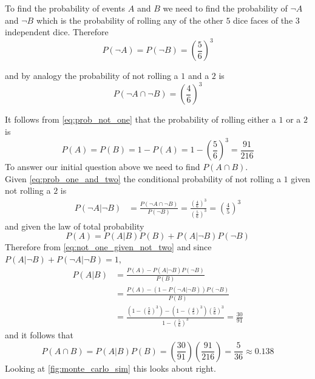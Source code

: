 \documentclass[12pt,a4paper]{article}
\begin{document}
To find the probability of events $A$ and $B$ we need to find the probability of $\neg A$ and $\neg B$ which is the probability of rolling any of the other $5$ dice faces of the $3$ independent dice. Therefore
\begin{equation}
P(\neg A) = P(\neg B) = \left(\frac{5}{6}\right)^3
\label{eq:prob_not_one}
\end{equation}

and by analogy the probability of not rolling a $1$ and a $2$ is
\begin{equation}
P(\neg A \cap \neg B) = \left(\frac{4}{6}\right)^3
\label{eq:prob_one_and_two}
\end{equation}

It follows from \cref{eq:prob_not_one} that the probability of rolling either a $1$ or a $2$ is
\begin{equation}
P(A) = P(B) = 1-P(A) = 1 - \left(\frac{5}{6}\right)^3 = \frac{91}{216}
\end{equation}
To answer our initial question above we need to find $P(A \cap B)$.\\

Given \cref{eq:prob_one_and_two} the conditional probability of not rolling a $1$ given not rolling a $2$ is
\begin{align}
P(\neg A| \neg B)   &= \frac{P(\neg A \cap \neg B)}{P(\neg B)} = \frac{\left(\frac{4}{6}\right)^3}{\left(\frac{5}{6}\right)^3} = \left(\frac{4}{5}\right)^3
\label{eq:not_one_given_not_two}
\end{align}
and given the law of total probability
\begin{equation}
P(A) = P(A|B)P(B)+P(A|\neg B)P(\neg B)
\end{equation}
Therefore from \cref{eq:not_one_given_not_two} and since $P(A|\neg B) + P(\neg A|\neg B) = 1$,
\begin{align}
P(A|B)  &= \frac{P(A) - P(A|\neg B)P(\neg B)}{P(B)}\\
        &= \frac{P(A) - (1 - P(\neg A|\neg B))P(\neg B)}{P(B)}\\
        &= \frac{\left(1-\left(\frac{5}{6}\right)^3\right) - \left(1-\left(\frac{4}{5}\right)^3\right)\left(\frac{5}{6}\right)^3}{1-\left(\frac{5}{6}\right)^3}
        = \frac{30}{91}
\label{eq:A_cond_B}
\end{align}
and it follows that
\begin{equation}
P(A \cap B) = P(A|B)P(B) = \left(\frac{30}{91}\right) \left(\frac{91}{216}\right) = \frac{5}{36} \approx 0.138
\label{eq:A_and_B}
\end{equation}
Looking at \cref{fig:monte_carlo_sim} this looks about right.\\
\end{document}
